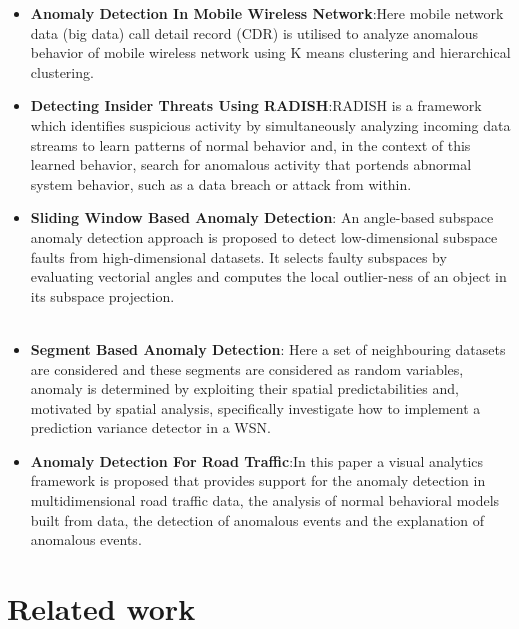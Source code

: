 \documentclass[10pt,a4paper,journal]{IEEEtran}
\begin{document}
\begin{itemize}
\item \textbf{Anomaly Detection In Mobile Wireless Network}:Here  mobile network data (big data) call detail record (CDR) is utilised to analyze anomalous behavior of mobile wireless network using K  means clustering and hierarchical clustering.


\item \textbf{Detecting Insider Threats Using RADISH}:RADISH is a framework which identifies suspicious activity by simultaneously analyzing incoming data streams to learn patterns of normal behavior and, in the context of this learned behavior, search for anomalous activity that portends abnormal system behavior, such as
a data breach or attack from within.\\

\item \textbf{Sliding Window Based Anomaly Detection}: An angle-based subspace anomaly detection approach is proposed to detect low-dimensional subspace faults from high-dimensional datasets. It selects faulty subspaces by evaluating vectorial angles and computes the local outlier-ness of an object in its subspace projection.\\
\\
\item \textbf{Segment Based Anomaly Detection}: Here a set of neighbouring datasets are considered and these segments are considered as random variables, anomaly is  determined by exploiting their spatial predictabilities and, motivated by spatial analysis, specifically investigate how to implement a prediction variance detector in a WSN.\\

\item \textbf{Anomaly Detection For Road Traffic}:In this paper a visual analytics framework is proposed that provides support for the anomaly detection  in multidimensional road traffic data, the analysis of normal behavioral models built from data, the detection of anomalous events and the explanation of anomalous events.
\end{itemize}






\section{Related work}
\end{document}
